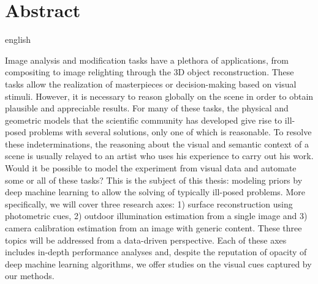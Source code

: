 \chapter*{Abstract}                      %

\begin{otherlanguage*}{english}

  Image analysis and modification tasks have a plethora of applications, from compositing to image relighting through the 3D object reconstruction. These tasks allow the realization of masterpieces or decision-making based on visual stimuli. However, it is necessary to reason globally on the scene in order to obtain plausible and appreciable results. For many of these tasks, the physical and geometric models that the scientific community has developed give rise to ill-posed problems with several solutions, only one of which is reasonable. To resolve these indeterminations, the reasoning about the visual and semantic context of a scene is usually relayed to an artist who uses his experience to carry out his work. Would it be possible to model the experiment from visual data and automate some or all of these tasks? This is the subject of this thesis: modeling priors by deep machine learning to allow the solving of typically ill-posed problems. More specifically, we will cover three research axes: 1) surface reconstruction using photometric cues, 2) outdoor illumination estimation from a single image and 3) camera calibration estimation from an image with generic content. These three topics will be addressed from a data-driven perspective. Each of these axes includes in-depth performance analyses and, despite the reputation of opacity of deep machine learning algorithms, we offer studies on the visual cues captured by our methods.

\end{otherlanguage*}
